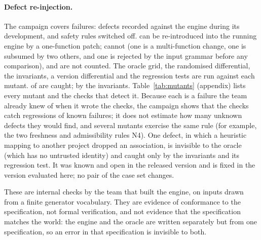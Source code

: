 \documentclass[11pt]{article}
\begin{document}
\paragraph{Defect re-injection.} The campaign covers \MutKnown{} failures:
defects recorded against the engine during its development, and safety rules
switched off. \MutTotal{} can be re-introduced into the running
engine by a one-function patch; \MutNotReinjected{} cannot (one is a
multi-function change, one is subsumed by two others, and one is rejected by
the input grammar before any comparison), and are not counted. The oracle
grid, the randomised differential, the invariants, a version differential and
the regression tests are run against each mutant. \MutCaught{} of
\MutTotal{} are caught; \MutByInv{} by the invariants.
Table~\ref{tab:mutants} (appendix) lists every mutant and the checks that
detect it. Because each is a failure the team already knew of when it wrote
the checks, the campaign shows that the checks catch regressions of known
failures; it does not estimate how many unknown defects they would find, and
several mutants exercise the same rule (for example, the two freshness and
admissibility rules N4). One defect, in which a
heuristic mapping to another project dropped an association, is invisible to
the oracle (which has no untrusted identity) and caught only by the invariants
and its regression test. It was known and open in the released version and
is fixed in the version evaluated here; no pair of the case set changes.



These are internal checks by the team that built the engine, on inputs drawn
from a finite generator vocabulary. They are evidence of conformance to the
specification, not formal verification, and not evidence that the
specification matches the world: the engine and the oracle are written
separately but from one specification, so an error in that specification is
invisible to both.
\end{document}
